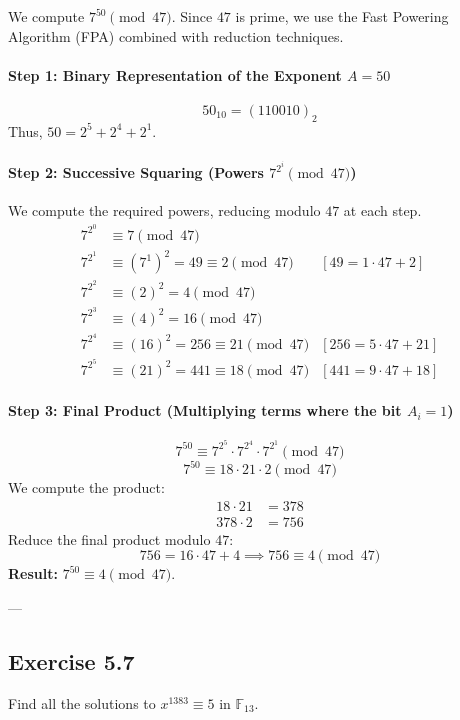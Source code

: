 \begin{solution}
We compute $7^{50} \pmod{47}$. Since $47$ is prime, we use the Fast Powering Algorithm (FPA) combined with reduction techniques.

\paragraph{Step 1: Binary Representation of the Exponent $A=50$}
$$ 50_{10} = (110010)_2 $$
Thus, $50 = 2^5 + 2^4 + 2^1$.

\paragraph{Step 2: Successive Squaring (Powers $7^{2^i} \pmod{47}$)}
We compute the required powers, reducing modulo $47$ at each step.
\begin{align*}
    7^{2^0} &\equiv 7 \pmod{47} \\
    7^{2^1} &\equiv (7^1)^2 = 49 \equiv 2 \pmod{47} & [49 = 1 \cdot 47 + 2] \text{} \\
    7^{2^2} &\equiv (2)^2 = 4 \pmod{47} & \text{} \\
    7^{2^3} &\equiv (4)^2 = 16 \pmod{47} \\
    7^{2^4} &\equiv (16)^2 = 256 \equiv 21 \pmod{47} & [256 = 5 \cdot 47 + 21] \text{} \\
    7^{2^5} &\equiv (21)^2 = 441 \equiv 18 \pmod{47} & [441 = 9 \cdot 47 + 18] \text{}
\end{align*}

\paragraph{Step 3: Final Product (Multiplying terms where the bit $A_i=1$)}
$$ 7^{50} \equiv 7^{2^5} \cdot 7^{2^4} \cdot 7^{2^1} \pmod{47} $$
$$ 7^{50} \equiv 18 \cdot 21 \cdot 2 \pmod{47} $$
We compute the product:
\begin{align*}
    18 \cdot 21 &= 378 \\
    378 \cdot 2 &= 756
\end{align*}
Reduce the final product modulo $47$:
$$ 756 = 16 \cdot 47 + 4 \implies 756 \equiv 4 \pmod{47} $$
\textbf{Result:} $7^{50} \equiv 4 \pmod{47}$.
\end{solution}

---
\subsection*{Exercise 5.7}
Find all the solutions to $x^{1383} \equiv 5$ in $\mathbb{F}_{13}$.

